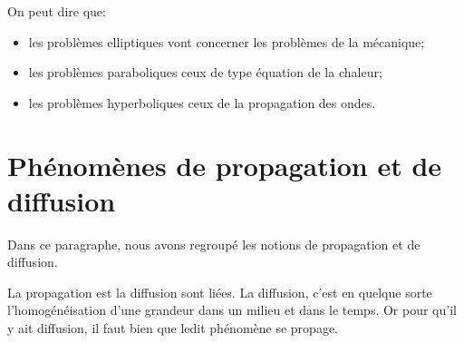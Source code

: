 \medskip
{}
On peut dire que:
\begin{itemize}
  \item les problèmes elliptiques vont concerner les problèmes de la mécanique;
  \item les problèmes paraboliques ceux de type équation de la chaleur;
  \item les problèmes hyperboliques ceux de la propagation des ondes.
\end{itemize}

\medskip
\section{Phénomènes de propagation et de diffusion}


Dans ce paragraphe, nous avons regroupé les notions de propagation
et de diffusion.

La propagation est la diffusion sont liées.
La diffusion, c'est en quelque sorte l'homogénéisation d'une grandeur dans un milieu et
dans le temps.
Or pour qu'il y ait diffusion, il faut bien que ledit phénomène se propage.


